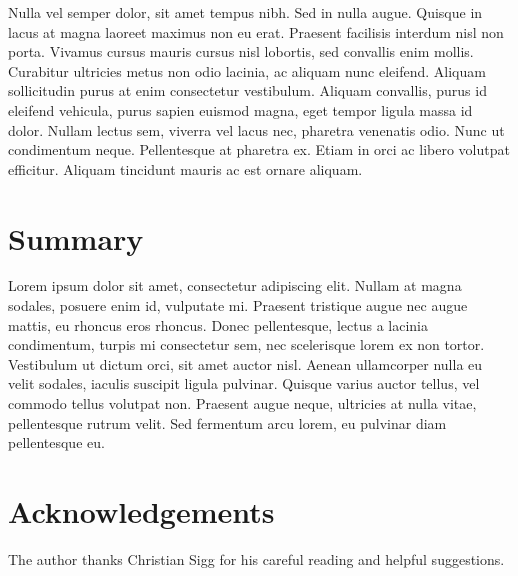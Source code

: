 \documentclass[10pt,conference,compsocconf]{IEEEtran}
\begin{document}
Nulla vel semper dolor, sit amet tempus nibh. Sed in nulla augue. Quisque in lacus at magna laoreet maximus non eu erat. Praesent facilisis interdum nisl non porta. Vivamus cursus mauris cursus nisl lobortis, sed convallis enim mollis. Curabitur ultricies metus non odio lacinia, ac aliquam nunc eleifend. Aliquam sollicitudin purus at enim consectetur vestibulum. Aliquam convallis, purus id eleifend vehicula, purus sapien euismod magna, eget tempor ligula massa id dolor. Nullam lectus sem, viverra vel lacus nec, pharetra venenatis odio. Nunc ut condimentum neque. Pellentesque at pharetra ex. Etiam in orci ac libero volutpat efficitur. Aliquam tincidunt mauris ac est ornare aliquam.

\section{Summary}
\label{sec:tips-writing}

Lorem ipsum dolor sit amet, consectetur adipiscing elit. Nullam at magna sodales, posuere enim id, vulputate mi. Praesent tristique augue nec augue mattis, eu rhoncus eros rhoncus. Donec pellentesque, lectus a lacinia condimentum, turpis mi consectetur sem, nec scelerisque lorem ex non tortor. Vestibulum ut dictum orci, sit amet auctor nisl. Aenean ullamcorper nulla eu velit sodales, iaculis suscipit ligula pulvinar. Quisque varius auctor tellus, vel commodo tellus volutpat non. Praesent augue neque, ultricies at nulla vitae, pellentesque rutrum velit. Sed fermentum arcu lorem, eu pulvinar diam pellentesque eu.



\section*{Acknowledgements}
The author thanks Christian Sigg for his careful reading and helpful
suggestions.



\end{document}

